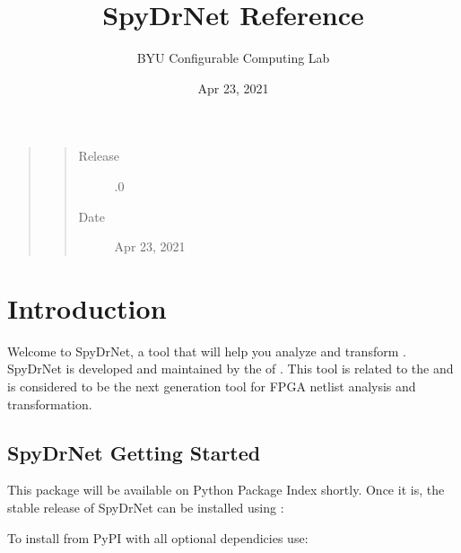 \documentclass[letterpaper,10pt,english,openany,oneside]{sphinxmanual}
\title{SpyDrNet Reference}
\date{Apr 23, 2021}
\author{BYU Configurable Computing Lab}
\begin{document}
\pagestyle{empty}
\sphinxmaketitle
\pagestyle{plain}
\sphinxtableofcontents
\pagestyle{normal}
\label{\detokenize{reference/index::doc}}

\begin{quote}
\begin{quote}\begin{description}
\item[{Release}] .0

\item[{Date}] \leavevmode
Apr 23, 2021

\end{description}\end{quote}
\end{quote}


\chapter{Introduction}
\label{\detokenize{reference/introduction:introduction}}\label{\detokenize{reference/introduction:id1}}\label{\detokenize{reference/introduction::doc}}
Welcome to SpyDrNet, a tool that will help you analyze and transform
. SpyDrNet is developed and maintained by the
 of . This tool is related to the  and is
considered to be the next generation tool for FPGA netlist analysis and transformation.


\section{SpyDrNet Getting Started}
\label{\detokenize{reference/introduction:spydrnet-getting-started}}

This package will be available on Python Package Index shortly. Once it is, the stable release of SpyDrNet can be installed using :

\begin{sphinxVerbatim}[commandchars=\\\{\}]
   
\end{sphinxVerbatim}

To install from PyPI with all optional dependicies use:
\end{document}
